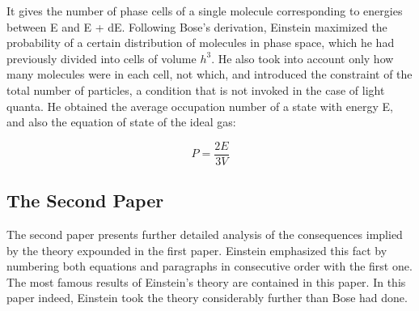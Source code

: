 \documentclass[12pt, letterpaper]{article}
\begin{document}
    It gives the number of phase cells of a single molecule corresponding to energies between E and 
    E + dE. Following Bose’s derivation, Einstein maximized the probability of a certain distribution
    of molecules in phase space, which he had previously divided into cells of volume $h^{3}$. He also took into account 
    only how many molecules were in each cell, not which, and introduced the constraint of the total number of particles, 
    a condition that is not invoked in the case of light quanta. He obtained the average occupation number of a state with 
    energy E, and also the equation of state of
    the ideal gas:

    \begin{equation}
        P = \frac{2E}{3V}
    \end{equation}

    \subsection*{The Second Paper}
    The second paper presents further detailed analysis of the consequences implied
    by the theory expounded in the first paper. Einstein emphasized this fact by
    numbering both equations and paragraphs in consecutive order with the first
    one.
    The most famous results of Einstein’s theory are contained in this
    paper. In this paper indeed, Einstein took the theory considerably further than
    Bose had done.
\end{document}
